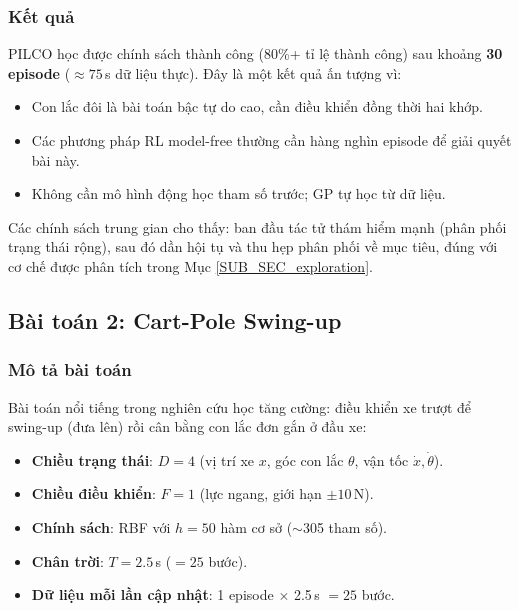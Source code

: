 \subsubsection{Kết quả}
\label{SUB_SUB_SEC_dp_results}

PILCO học được chính sách thành công (80\%+ tỉ lệ thành công) sau khoảng \textbf{30 episode} ($\approx 75$\,s dữ liệu thực). Đây là một kết quả ấn tượng vì:
\begin{itemize}
    \item Con lắc đôi là bài toán bậc tự do cao, cần điều khiển đồng thời hai khớp.
    \item Các phương pháp RL model-free thường cần hàng nghìn episode để giải quyết bài này.
    \item Không cần mô hình động học tham số trước; GP tự học từ dữ liệu.
\end{itemize}

Các chính sách trung gian cho thấy: ban đầu tác tử thám hiểm mạnh (phân phối trạng thái rộng), sau đó dần hội tụ và thu hẹp phân phối về mục tiêu, đúng với cơ chế được phân tích trong Mục \ref{SUB_SEC_exploration}.

\subsection{Bài toán 2: Cart-Pole Swing-up}
\label{SUB_SEC_cartpole}

\subsubsection{Mô tả bài toán}
\label{SUB_SUB_SEC_cp_description}

Bài toán nổi tiếng trong nghiên cứu học tăng cường: điều khiển xe trượt để swing-up (đưa lên) rồi cân bằng con lắc đơn gắn ở đầu xe:
\begin{itemize}
    \item \textbf{Chiều trạng thái}: $D = 4$ (vị trí xe $x$, góc con lắc $\theta$, vận tốc $\dot{x}, \dot{\theta}$).
    \item \textbf{Chiều điều khiển}: $F = 1$ (lực ngang, giới hạn $\pm 10$\,N).
    \item \textbf{Chính sách}: RBF với $h = 50$ hàm cơ sở ($\sim$305 tham số).
    \item \textbf{Chân trời}: $T = 2.5$\,s ($= 25$ bước).
    \item \textbf{Dữ liệu mỗi lần cập nhật}: 1 episode $\times$ 2.5\,s $= 25$ bước.
\end{itemize}

